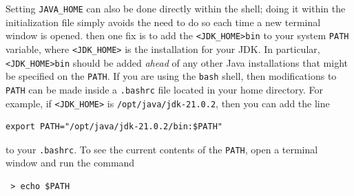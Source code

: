 Setting {\tt JAVA\_HOME} can also be done directly within the shell;
doing it within the initialization file simply avoids the need to do
so each time a new terminal window is opened.
\fi
\ifLinux
then one fix is to add the \directory{} {\tt <JDK\_HOME>\SEP bin} to
your system {\tt PATH} variable, where {\tt <JDK\_HOME>} is the
installation \directory{} for your JDK.  In particular, {\tt
<JDK\_HOME>\SEP bin} should be added {\it ahead} of any other Java
installations that might be specified on the {\tt PATH}.  If you are
using the {\tt bash} shell, then modifications to {\tt PATH} can be
made inside a {\tt .bashrc} file located in your home directory.
For example, if {\tt <JDK\_HOME>} is {\tt /opt/java/jdk-21.0.2},
then you can add the line
\begin{verbatim}
export PATH="/opt/java/jdk-21.0.2/bin:$PATH"
\end{verbatim}
to your {\tt .bashrc}. To see the current contents of the {\tt PATH},
open a terminal window and run the command
\begin{verbatim}
 > echo $PATH
\end{verbatim}
\fi


